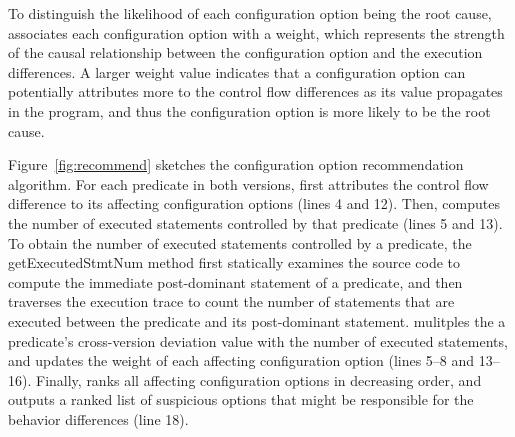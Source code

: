 To distinguish the likelihood of each configuration
option being the root cause, \ourtool associates each
configuration option with a weight, which represents the strength of
the causal relationship between the configuration option
and the execution differences.
A larger weight value indicates that a configuration option
can potentially attributes more to the control
flow differences as its value propagates in the program, and thus
the configuration option is more likely to be the root cause.

Figure~\ref{fig:recommend} sketches the configuration option
recommendation algorithm.
For each predicate in both versions,
\ourtool first attributes the control flow difference 
to its affecting configuration options (lines 4 and 12). Then,
\ourtool computes the number of executed statements controlled
by that predicate (lines 5 and 13). To obtain the number of
executed statements controlled by a predicate,
the getExecutedStmtNum method first statically examines the
source code to compute the immediate post-dominant statement
of a predicate, and then traverses the execution trace to count
the number of statements that
are executed between the predicate and its post-dominant
statement. 
\ourtool mulitples the a predicate's cross-version deviation value 
with the number of executed statements, and updates the
weight of each affecting configuration option (lines 5--8
and 13--16).
Finally, \ourtool ranks all affecting configuration options
in decreasing order, and outputs a ranked list of suspicious
options that might be responsible for the
behavior differences (line 18). 

